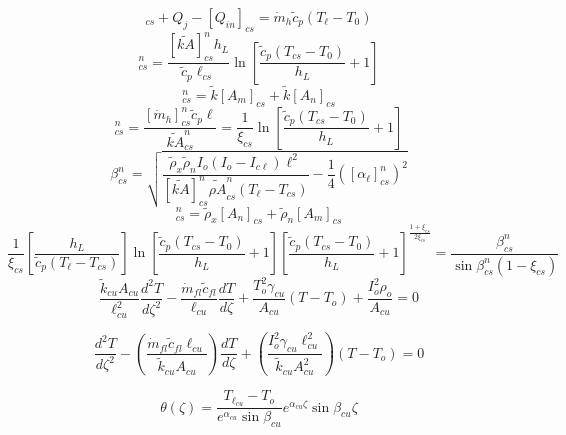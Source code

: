 \begin{equation}%
[Q_\ell]_{cs}+Q_j-[Q_{in}]_{cs}=\dot{m}_h\tilde{c}_p(T_\ell-T_0)
\end{equation}
\begin{equation}%
[Q_{in}]_{cs}^{n}=\frac{[\tilde{kA}]_{cs}^{n}h_L}{\tilde{c}_p\ell_{cs}}\ln\left[\frac{\tilde{c}_p(T_{cs}-T_0)}{h_L}+1\right]
\end{equation}
\begin{equation}%
[\tilde{kA}]_{cs}^{n}=\tilde{k}[A_m]_{cs}+\tilde{k}[A_n]_{cs}
\end{equation}
\begin{equation}%
[\alpha_\ell]_{cs}^{n}=\frac{[\dot{m}_h]_{cs}^{n}\tilde{c}_p\ell}{\tilde{kA}_{cs}^{n}} 
=\frac{1}{\xi_{cs}}\ln\left[\frac{\tilde{c}_p(T_{cs}-T_0)}{h_L}+1\right]
\end{equation}
\begin{equation}%
\beta_{cs}^{n}=\sqrt{\frac{\tilde{\rho}_x\tilde{\rho}_nI_o(I_o-I_{c\ell})\ell^2}{[\tilde{kA}]_{cs}^{n}\tilde{\rho A}_{cs}^{n}(T_\ell-T_{cs})}-\frac{1}{4}([\alpha_\ell]_{cs}^{n})^2}
\end{equation}
\begin{equation}%
[\tilde{\rho A}]_{cs}^{n}=\tilde{\rho}_x[A_n]_{cs}+\tilde{\rho}_n[A_m]_{cs}
\end{equation}
\begin{equation}%
\frac{1}{\xi_{cs}}\left[\frac{h_L}{\tilde{c}_p(T_\ell-T_{cs})}\right]\ln\left[\frac{\tilde{c}_p(T_{cs}-T_0)}{h_L}+1\right]\left[\frac{\tilde{c}_p(T_{cs}-T_0)}{h_L}+1\right]^{\frac{1+\xi_{cs}}{2\xi_{cs}}}=\frac{\beta_{cs}^{n}}{\sin\beta_{cs}^{n}(1-\xi_{cs})}
\end{equation}
\begin{equation}%
\frac{\tilde{k}_{cu}A_{cu}}{\ell_{cu}^{2}}\frac{d^2T}{d\zeta^2}-\frac{\dot{m}_{fl}\tilde{c}_{fl}}{\ell_{cu}}\frac{dT}{d\zeta}+\frac{T_{o}^{2}\gamma_{cu}}{A_{cu}}(T-T_o)+\frac{I_{o}^{2}\rho_o}{A_{cu}}=0
\end{equation}

\begin{equation}%
\frac{d^2T}{d\zeta^2}-\left(\frac{\dot{m}_{fl}\tilde{c}_{fl}\ell_{cu}}{\tilde{k}_{cu}A_{cu}}\right)\frac{dT}{d\zeta}+\left(\frac{I_{o}^{2}\gamma_{cu}\ell_{cu}^{2}}{\tilde{k}_{cu}A_{cu}^{2}}\right)(T-T_o)=0
\end{equation}

\begin{equation}%
\theta(\zeta)=\frac{T_{\ell_{cu}}-T_o}{e^{\alpha_{cu}}\sin\beta_{cu}}e^{\alpha_{cu}\zeta}\sin\beta_{cu}\zeta
\end{equation}

